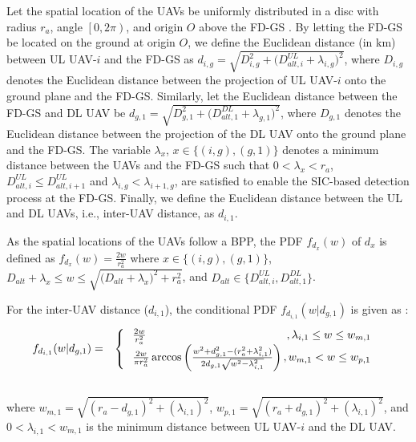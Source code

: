 Let the spatial location of the UAVs be uniformly distributed in a disc with radius $r_a$, angle $\left[0,2\pi\right)$, and origin $O$ above the FD-GS \cite{chetlur2017downlink}. By letting the FD-GS be located on the ground at origin $O$, we define the Euclidean distance (in km) between UL UAV-$i$ and the FD-GS as $d_{i,g}=\sqrt{D_{i,g}^2 + \big(D_{alt,i}^{UL} + \lambda_{i,g}\big)^2}$, where $D_{i,g}$ denotes the Euclidean distance between the projection of UL UAV-$i$ onto the ground plane and the FD-GS. Similarly, let the Euclidean distance between the FD-GS and DL UAV be $d_{g,1}=\sqrt{D_{g,1}^2+\big(D_{alt,1}^{DL} + \lambda_{g,1}\big)^2}$, where $D_{g,1}$ denotes the Euclidean distance between the projection of the DL UAV onto the ground plane and the FD-GS. The variable $\lambda_x$, $x \in \{(i,g),(g,1)\}$ denotes a minimum distance between the UAVs and the FD-GS such that $0 < \lambda_{x} < r_a$, $D_{alt,i}^{UL} \leq D_{alt,i+1}^{UL}$ and $\lambda_{i,g}<\lambda_{i+1,g}$, are satisfied to enable the SIC-based detection process at the FD-GS. Finally, we define the Euclidean distance between the UL and DL UAVs, i.e., inter-UAV distance, as $d_{i,1}$.

As the spatial locations of the UAVs follow a BPP, the PDF $f_{d_{x}}(w)$ of $d_{x}$ is defined as \cite[eq. (3)]{chetlur2017downlink} $f_{d_{x}}(w) =  \frac{2w}{r_a^2}$ where $x \in \{(i,g), (g,1)\}$, $D_{alt} + \lambda_{x} \leq w \leq \sqrt{ \big(D_{alt}+\lambda_{x}\big)^2+r_{a}^2}$, and $D_{alt} \in \{D_{alt,i}^{UL}, D_{alt,1}^{DL}\}$.

For the inter-UAV distance ($d_{i,1}$), the conditional PDF $f_{d_{i,1}}(w|d_{g,1})$ is given as \cite[eq. (2)]{chetlur2017downlink}:
\begin{eqnarray}
f_{d_{i,1}}(w|d_{g,1}) & = & \begin{cases}
		\hspace{0.25cm} \frac{2w}{r_a^2} \hspace{4.4cm}, \lambda_{i,1} \leq w \leq w_{m,1}\\
    \hspace{0.25cm} \frac{2w}{\pi r_a^2}\arccos\left( \frac{w^2 + d_{g,1}^2 - (r_a^2+\lambda_{i,1}^2)}{2d_{g,1}\sqrt{w^2 - \lambda_{i,1}^2}} \right), w_{m,1} < w \leq w_{p,1}\\ 
  \end{cases} \\\nonumber
\end{eqnarray}
where $w_{m,1}=\sqrt{(r_a - d_{g,1})^2 + (\lambda_{i,1})^2}$, $w_{p,1}=\sqrt{(r_a + d_{g,1})^2 + (\lambda_{i,1})^2}$, and $0 < \lambda_{i,1} <  w_{m,1}$ is the minimum distance between UL UAV-$i$ and the DL UAV. 

